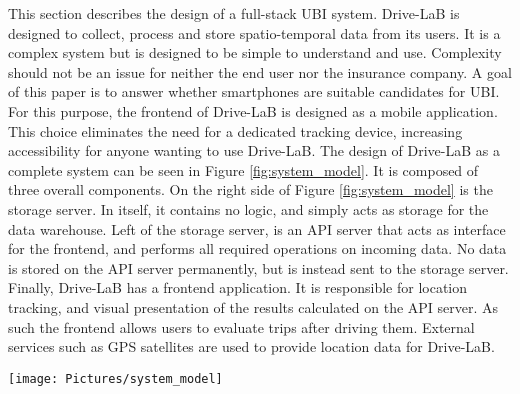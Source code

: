 This section describes the design of a full-stack UBI system. Drive-LaB is designed to collect, process and store spatio-temporal data from its users. It is a complex system but is designed to be simple to understand and use. Complexity should not be an issue for neither the end user nor the insurance company.
A goal of this paper is to answer whether smartphones are suitable candidates for UBI. For this purpose, the frontend of Drive-LaB is designed as a mobile application. This choice eliminates the need for a dedicated tracking device, increasing accessibility for anyone wanting to use Drive-LaB.
The design of Drive-LaB as a complete system can be seen in Figure \ref{fig:system_model}. It is composed of three overall components. On the right side of Figure \ref{fig:system_model} is the storage server. In itself, it contains no logic, and simply acts as storage for the data warehouse. Left of the storage server, is an API server that acts as interface for the frontend, and performs all required operations on incoming data. No data is stored on the API server permanently, but is instead sent to the storage server. Finally, Drive-LaB has a frontend application. It is responsible for location tracking, and visual presentation of the results calculated on the API server. As such the frontend allows users to evaluate trips after driving them. External services such as GPS satellites are used to provide location data for Drive-LaB.

\begin{figure*}[tb]
\centering
\texttt{[image: Pictures/system\_model]}
\caption{Composition of the system}
\label{fig:system_model}
\end{figure*}